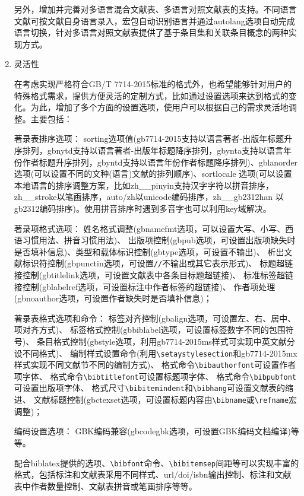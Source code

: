 \documentclass[11pt]{article} %
\begin{document}
\begin{enumerate}
另外，增加并完善对多语言混合文献表、多语言对照文献表的支持。不同语言文献可按文献自身语言录入，宏包自动识别语言并通过autolang选项自动完成语言切换，针对多语言对照文献表提供了基于条目集和关联条目概念的两种实现方式。


  \item 灵活性

在考虑实现严格符合GB/T 7714-2015标准的格式外，也希望能够针对用户的特殊格式需求，提供方便灵活的定制方式，比如通过设置选项来达到格式的变化。为此，增加了多个方面的设置选项，使用户可以根据自己的需求灵活地调整。主要包括：

著录表排序选项：
sorting选项值(gb7714-2015支持以语言著者-出版年标题升序排列，gbnytd支持以语言著者-出版年标题降序排列，gbynta支持以语言年份作者标题升序排列，gbyntd支持以语言年份作者标题降序排列)、gblanorder 选项(可以设置不同的文种(语言)文献的排列顺序)、sortlocale 选项(可以设置本地语言的排序调整方案，比如zh\_\_pinyin支持汉字字符以拼音排序，zh\_\_stroke以笔画排序，auto/zh以unicode编码排序，zh\_\_gb2312han 以gb2312编码排序)。使用拼音排序时遇到多音字也可以利用key域解决。



著录项格式选项：
姓名格式调整(gbnamefmt选项，可以设置大写、小写、西语习惯用法、拼音习惯用法)、
出版项控制(gbpub选项，可设置出版项缺失时是否填补信息)、类型和载体标识控制(gbtype选项，可设置不输出)、
析出文献标识符控制(gbpunctin选项，可设置\texttt{//}不输出或其它表示形式)、
标题超链接控制(gbtitlelink选项，可设置文献表中各条目标题超链接)、
标准标签超链接控制(gblabelref选项，可设置标注中作者标签的超链接)、
作者项处理(gbnoauthor选项，可设置作者缺失时是否填补信息)；

著录表格式选项和命令：
标签对齐控制(gbalign选项，可设置左、右、居中、项对齐方式)、
标签格式控制(gbbiblabel选项，可设置标签数字不同的包围符号)、
条目格式控制(gbstyle选项，利用gb7714-2015ms样式可实现中英文献分设不同格式)、
编制样式设置命令(利用\verb|\setaystylesection|和gb7714-2015mx样式实现不同文献节不同的编制方式)、
格式命令\verb|\bibauthorfont|可设置作者项字体、
格式命令\verb|\bibtitlefont|可设置标题项字体、
格式命令\verb|\bibpubfont|可设置出版项字体、
格式尺寸\verb|\bibitemindent|和\verb|\bibhang|可设置文献表的缩进、
文献标题控制(gbctexset选项，可设置标题内容由\verb|\bibname|或\verb|\refname|宏调整)；

编码设置选项：
GBK编码兼容(gbcodegbk选项，可设置GBK编码文档编译)等等。

配合biblatex提供的选项、\verb|\bibfont|命令、\verb|\bibitemsep|间距等可以实现丰富的格式，包括标注和文献表采用不同样式、url/doi/isbn输出控制、标注和文献表中作者数量控制、文献表拼音或笔画排序等等。



\end{enumerate}
\end{document}
